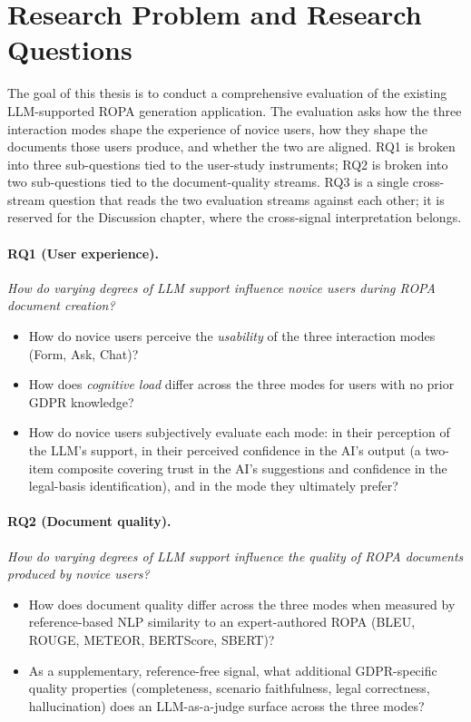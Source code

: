  
\section{Research Problem and Research Questions}
The goal of this thesis is to conduct a comprehensive evaluation of the existing LLM-supported ROPA generation application. The evaluation asks how the three interaction modes shape the experience of novice users, how they shape the documents those users produce, and whether the two are aligned. RQ1 is broken into three sub-questions tied to the user-study instruments; RQ2 is broken into two sub-questions tied to the document-quality streams. RQ3 is a single cross-stream question that reads the two evaluation streams against each other; it is reserved for the Discussion chapter, where the cross-signal interpretation belongs.

\paragraph{RQ1 (User experience).} \emph{How do varying degrees of LLM support influence novice users during ROPA document creation?}
\begin{itemize}
    \item[\textbf{RQ1.1}] How do novice users perceive the \emph{usability} of the three interaction modes (Form, Ask, Chat)?
    \item[\textbf{RQ1.2}] How does \emph{cognitive load} differ across the three modes for users with no prior GDPR knowledge?
    \item[\textbf{RQ1.3}] How do novice users subjectively evaluate each mode: in their perception of the LLM's support, in their perceived confidence in the AI's output (a two-item composite covering trust in the AI's suggestions and confidence in the legal-basis identification), and in the mode they ultimately prefer?
\end{itemize}

\bigskip
\bigskip

\paragraph{RQ2 (Document quality).} \emph{How do varying degrees of LLM support influence the quality of ROPA documents produced by novice users?}
\begin{itemize}
    \item[\textbf{RQ2.1}] How does document quality differ across the three modes when measured by reference-based NLP similarity to an expert-authored ROPA (BLEU, ROUGE, METEOR, BERTScore, SBERT)?
    \item[\textbf{RQ2.2}] As a supplementary, reference-free signal, what additional GDPR-specific quality properties (completeness, scenario faithfulness, legal correctness, hallucination) does an LLM-as-a-judge surface across the three modes?
\end{itemize}
